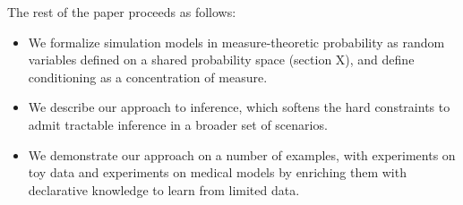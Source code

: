 The rest of the paper proceeds as follows:
\begin{itemize}
\item We formalize simulation models in measure-theoretic probability as random variables defined on a shared probability space (section X), and define conditioning as a concentration of measure.
\item We describe our approach to inference, which softens the hard constraints to admit tractable inference in a broader set of scenarios.
\item  We demonstrate our approach on a number of examples, with experiments on toy data and experiments on medical models by enriching them with declarative knowledge to learn from limited data.
\end{itemize}